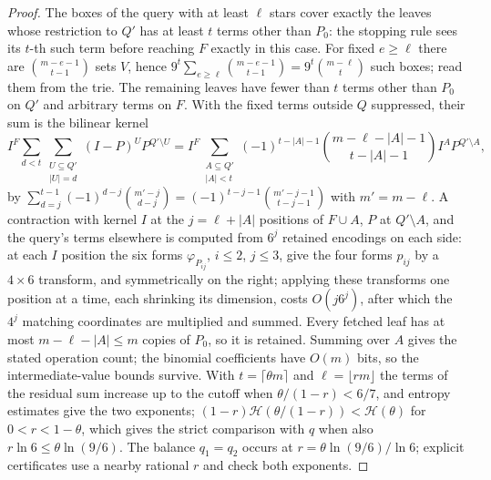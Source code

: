 \documentclass[11pt]{article}
\newcommand{\HH}{\mathcal H}
\begin{document}
\begin{proof}
The boxes of the query with at least $\ell$ stars cover exactly the leaves
whose restriction to $Q'$ has at least $t$ terms other than $P_0$: the
stopping rule sees its $t$-th such term before reaching $F$ exactly in this
case. For fixed $e\ge\ell$ there are $\binom{m-e-1}{t-1}$ sets $V$, hence
$9^t\sum_{e\ge\ell}\binom{m-e-1}{t-1}=9^t\binom{m-\ell}t$ such boxes; read
them from the trie. The remaining leaves have fewer than $t$ terms other
than $P_0$ on $Q'$ and arbitrary terms on $F$. With the fixed terms outside
$Q$ suppressed, their sum is the bilinear kernel
\[
I^{F}\sum_{d<t}\sum_{\substack{U\subseteq Q'\\|U|=d}}(I-P)^UP^{Q'\setminus U}
=I^{F}\sum_{\substack{A\subseteq Q'\\|A|<t}}
(-1)^{t-|A|-1}\binom{m-\ell-|A|-1}{t-|A|-1}I^AP^{Q'\setminus A},
\]
by $\sum_{d=j}^{t-1}(-1)^{d-j}\binom{m'-j}{d-j}=(-1)^{t-j-1}\binom{m'-j-1}{t-j-1}$
with $m'=m-\ell$. A contraction with kernel $I$ at the $j=\ell+|A|$
positions of $F\cup A$, $P$ at $Q'\setminus A$, and the query's terms
elsewhere is computed from $6^j$ retained encodings on each side: at each
$I$ position the six forms $\varphi_{P_{ij}}$, $i\le2$, $j\le3$, give the
four forms $p_{ij}$ by a $4\times6$ transform, and symmetrically on the
right; applying these transforms one position at a time, each shrinking its
dimension, costs $O(j6^j)$, after which the $4^j$ matching coordinates are
multiplied and summed. Every fetched leaf has at most $m-\ell-|A|\le m$
copies of $P_0$, so it is retained. Summing over $A$ gives the stated
operation count; the binomial coefficients have $O(m)$ bits, so the
intermediate-value bounds survive. With $t=\lceil\theta m\rceil$ and
$\ell=\lfloor rm\rfloor$ the terms of the residual sum increase up to the
cutoff when $\theta/(1-r)<6/7$, and entropy estimates give the two
exponents; $(1-r)\HH(\theta/(1-r))<\HH(\theta)$ for $0<r<1-\theta$, which
gives the strict comparison with $q$ when also $r\ln6\le\theta\ln(9/6)$.
The balance $q_1=q_2$ occurs at
$r=\theta\ln(9/6)/\ln6$; explicit certificates use a nearby rational $r$
and check both exponents.
\end{proof}
\end{document}
